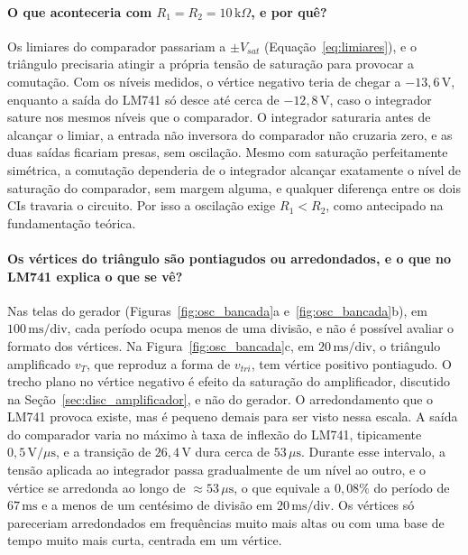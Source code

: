\documentclass[11pt,a4paper]{article}
\begin{document}
\paragraph{O que aconteceria com $R_1 = R_2 = 10\,\text{k}\Omega$, e por quê?}

Os limiares do comparador passariam a $\pm V_{sat}$ (Equação~\ref{eq:limiares}), e o triângulo precisaria atingir a própria tensão de saturação para provocar a comutação. Com os níveis medidos, o vértice negativo teria de chegar a $-13{,}6\,\text{V}$, enquanto a saída do LM741 só desce até cerca de $-12{,}8\,\text{V}$, caso o integrador sature nos mesmos níveis que o comparador. O integrador saturaria antes de alcançar o limiar, a entrada não inversora do comparador não cruzaria zero, e as duas saídas ficariam presas, sem oscilação. Mesmo com saturação perfeitamente simétrica, a comutação dependeria de o integrador alcançar exatamente o nível de saturação do comparador, sem margem alguma, e qualquer diferença entre os dois CIs travaria o circuito. Por isso a oscilação exige $R_1 < R_2$, como antecipado na fundamentação teórica.

\paragraph{Os vértices do triângulo são pontiagudos ou arredondados, e o que no LM741 explica o que se vê?}

Nas telas do gerador (Figuras~\ref{fig:osc_bancada}a e~\ref{fig:osc_bancada}b), em $100\,\text{ms/div}$, cada período ocupa menos de uma divisão, e não é possível avaliar o formato dos vértices. Na Figura~\ref{fig:osc_bancada}c, em $20\,\text{ms/div}$, o triângulo amplificado $v_T$, que reproduz a forma de $v_{tri}$, tem vértice positivo pontiagudo. O trecho plano no vértice negativo é efeito da saturação do amplificador, discutido na Seção~\ref{sec:disc_amplificador}, e não do gerador. O arredondamento que o LM741 provoca existe, mas é pequeno demais para ser visto nessa escala. A saída do comparador varia no máximo à taxa de inflexão do LM741, tipicamente $0{,}5\,\text{V}/\mu\text{s}$, e a transição de $26{,}4\,\text{V}$ dura cerca de $53\,\mu\text{s}$. Durante esse intervalo, a tensão aplicada ao integrador passa gradualmente de um nível ao outro, e o vértice se arredonda ao longo de $\approx 53\,\mu\text{s}$, o que equivale a $0{,}08\%$ do período de $67\,\text{ms}$ e a menos de um centésimo de divisão em $20\,\text{ms/div}$. Os vértices só pareceriam arredondados em frequências muito mais altas ou com uma base de tempo muito mais curta, centrada em um vértice.
\end{document}
